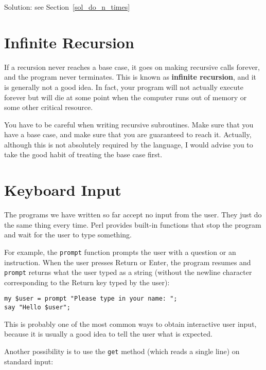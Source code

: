 Solution: see Section~\ref{sol_do_n_times}


\section{Infinite Recursion}


If a recursion never reaches a base case, it goes on making
recursive calls forever, and the program never terminates.  This is
known as {\bf infinite recursion}, and it is generally not
a good idea. In fact, your program will not actually execute 
forever but will die at some point when the computer runs out of 
memory or some other critical resource.

You have to be careful when writing recursive subroutines. 
Make sure that you have a base case, and make sure that 
you are guaranteed to reach it. Actually, although this is not 
absolutely required by the language, I would advise you to 
take the good habit of treating the base case first.


\section{Keyboard Input}

The programs we have written so far accept no input from 
the user. They just do the same thing every time. Perl 
provides built-in functions that stop the program and
wait for the user to type something. 

For example, the {\tt prompt} function prompts the user with 
a question or an instruction. When the user presses 
{\sf Return} or {\sf Enter}, the program resumes and 
\verb"prompt" returns what the user typed as a string 
(without the newline character corresponding to the 
{\sf Return} key typed by the user):

\begin{verbatim}
my $user = prompt "Please type in your name: ";
say "Hello $user";
\end{verbatim}
%

This is probably one of the most common ways to obtain 
interactive user input, because it is usually a good idea 
to tell the user what is expected.

Another possibility is to use the {\tt get} method (which
 reads a single line) on standard input:

